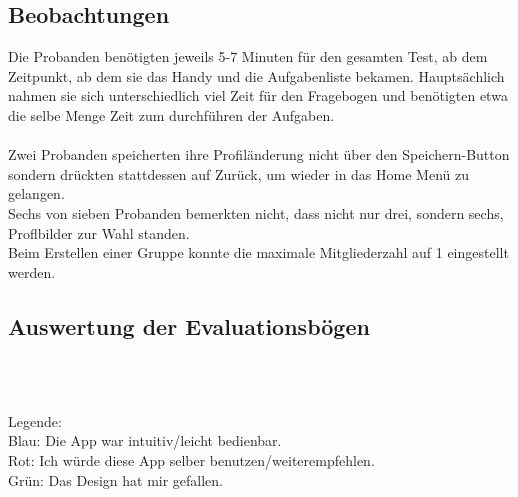 \documentclass[a4paper]{scrreprt}
\begin{document}
\subsection*{Beobachtungen}
Die Probanden benötigten jeweils 5-7 Minuten für den gesamten Test, ab dem Zeitpunkt, ab dem sie das Handy und die Aufgabenliste bekamen. Hauptsächlich nahmen sie sich unterschiedlich viel Zeit für den Fragebogen und benötigten etwa die selbe Menge Zeit zum durchführen der Aufgaben.\\
\ \\
Zwei Probanden speicherten ihre Profiländerung nicht über den Speichern-Button sondern drückten stattdessen auf Zurück, um wieder in das Home Menü zu gelangen.
\ \\
Sechs von sieben Probanden bemerkten nicht, dass nicht nur drei, sondern sechs, Proflbilder zur Wahl standen.
\ \\
Beim Erstellen einer Gruppe konnte die maximale Mitgliederzahl auf 1 eingestellt werden. 

\subsection*{Auswertung der Evaluationsbögen}
\ \\
\ \\
Legende: \ \\
Blau: Die App war intuitiv/leicht bedienbar. \\
Rot:  Ich würde diese App selber benutzen/weiterempfehlen. \\
Grün: Das Design hat mir gefallen.
\end{document}
